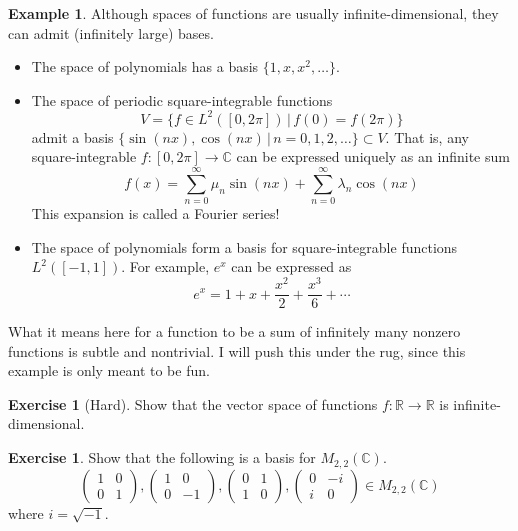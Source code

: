 \documentclass[11pt, reqno]{amsart}
\theoremstyle{definition} %
\newtheorem{exercise}[theorem]{Exercise}
\newtheorem{example}[theorem]{Example}
\newcommand{\R}{\mathbb{R}}
\newcommand{\C}{\mathbb{C}}
\begin{document}
\begin{example}
Although spaces of functions are usually infinite-dimensional, they can admit (infinitely large) bases.
    \begin{itemize}
        \item The space of polynomials has a basis $\{1,x,x^2,\dots\}$.
        \item The space of periodic square-integrable functions
        \begin{equation}
            V=\{f\in L^2([0,2\pi])\,|\,f(0)=f(2\pi)\}
        \end{equation}
        admit a basis $\{\sin(nx),\cos(nx)\,|\,n=0,1,2,\dots\}\subset V$. That is, any square-integrable $f:[0,2\pi]\to \C$ can be expressed uniquely as an infinite sum 
        \begin{equation}
            f(x)=\sum\limits_{n=0}^\infty \mu_n\sin(nx)+\sum\limits_{n=0}^\infty \lambda_n \cos(nx)
        \end{equation}
        This expansion is called a Fourier series!
        \item The space of polynomials form a basis for square-integrable functions $L^2([-1,1])$. For example, $e^x$ can be expressed as
        \begin{equation}
            e^x=1+x+\frac{x^2}2+\frac{x^3}6+\cdots
        \end{equation}
    \end{itemize}
What it means here for a function to be a sum of infinitely many nonzero functions is subtle and nontrivial. I will push this under the rug, since this example is only meant to be fun.
\end{example}

\begin{exercise}[Hard]
    Show that the vector space of functions $f:\R \to \R$ is infinite-dimensional.
\end{exercise} 

\begin{exercise}
    Show that the following is a basis for $M_{2,2}(\C)$.
    \begin{equation}
        \begin{pmatrix}
            1 & 0\\
            0 & 1
        \end{pmatrix}
        ,
        \begin{pmatrix}
            1 & 0\\
            0 & -1
        \end{pmatrix}
        ,
        \begin{pmatrix}
            0 & 1\\
            1 & 0
        \end{pmatrix}
        ,
        \begin{pmatrix}
            0 & -i\\
            i & 0
        \end{pmatrix}
        \in M_{2,2}(\C)
    \end{equation}
    where $i=\sqrt{-1}$.
\end{exercise}
\end{document}
